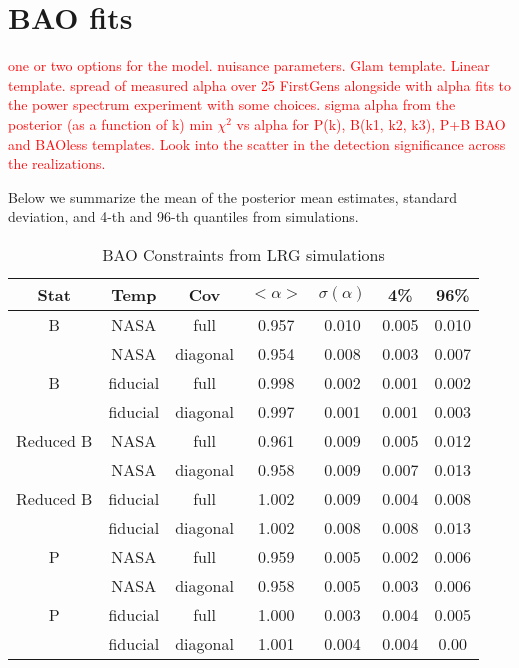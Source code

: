 \section{BAO fits}
\label{sec:fits}

\textcolor{red}{one or two options for the model. nuisance parameters.}
\textcolor{red}{Glam template. Linear template.}
\textcolor{red}{spread of measured alpha over 25 FirstGens}
\textcolor{red}{alongside with alpha fits to the power spectrum}
\textcolor{red}{experiment with some choices.}
\textcolor{red}{sigma alpha from the posterior (as a function of k)}
\textcolor{red}{min $\chi^{2}$ vs alpha for P(k), B(k1, k2, k3), P+B BAO and BAOless templates. Look into the scatter in the detection significance across the realizations.}




Below we summarize the mean of the posterior mean estimates, standard deviation, and 4-th and 96-th quantiles from simulations. 

\begin{table}
\caption{‌BAO Constraints from LRG simulations}
\begin{center}
\begin{tabular}{ccccccc}
Stat & Temp & Cov &$< \alpha >$ & $\sigma(\alpha) $ & 4\%&96\%\\
\hline
                            B  &       NASA & full & 0.957 & 0.010& 0.005 & 0.010\\ 
 &       NASA & diagonal & 0.954 & 0.008 &0.003 &0.007\\ 
\hline
                            B  &   fiducial & full & 0.998 & 0.002& 0.001 & 0.002\\ 
 &   fiducial & diagonal & 0.997 & 0.001 &0.001 &0.003\\ 
\hline
                    Reduced B  &       NASA & full & 0.961 & 0.009& 0.005 & 0.012\\ 
 &       NASA & diagonal & 0.958 & 0.009 &0.007 &0.013\\ 
\hline
                    Reduced B  &   fiducial & full & 1.002 & 0.009& 0.004 & 0.008\\ 
 &   fiducial & diagonal & 1.002 & 0.008 &0.008 &0.013\\ 
\hline
                            P  &       NASA & full & 0.959 & 0.005& 0.002 & 0.006\\ 
 &       NASA & diagonal & 0.958 & 0.005 &0.003 &0.006\\ 
\hline
                            P  &   fiducial & full & 1.000 & 0.003& 0.004 & 0.005\\ 
 &   fiducial & diagonal & 1.001 & 0.004 &0.004 &0.00
\end{tabular}
\end{center}
\label{tab:lrg}
\end{table}


